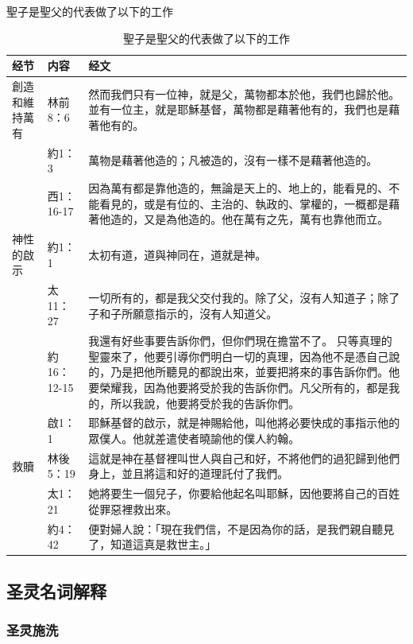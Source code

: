聖子是聖父的代表做了以下的工作
\begin{table}[H]
\centering
\begin{tabular}{p{5.7em}p{6em}p{33em}}  \toprule
经节&内容&经文 \\  \midrule
創造和維持萬有&林前8：6&然而我們只有一位神，就是父，萬物都本於他，我們也歸於他。並有一位主，就是耶穌基督，萬物都是藉著他有的，我們也是藉著他有的。\\  \midrule
&約1：3&萬物是藉著他造的；凡被造的，沒有一樣不是藉著他造的。\\  \midrule
&西1：16-17&因為萬有都是靠他造的，無論是天上的、地上的，能看見的、不能看見的，或是有位的、主治的、執政的、掌權的，一概都是藉著他造的，又是為他造的。他在萬有之先，萬有也靠他而立。\\  \midrule
神性的啟示&約1：1&太初有道，道與神同在，道就是神。\\  \midrule
&太11：27&一切所有的，都是我父交付我的。除了父，沒有人知道子；除了子和子所願意指示的，沒有人知道父。\\  \midrule
&約16：12-15&我還有好些事要告訴你們，但你們現在擔當不了。 只等真理的聖靈來了，他要引導你們明白一切的真理，因為他不是憑自己說的，乃是把他所聽見的都說出來，並要把將來的事告訴你們。他要榮耀我，因為他要將受於我的告訴你們。凡父所有的，都是我的，所以我說，他要將受於我的告訴你們。\\  \midrule
&啟1：1&耶穌基督的啟示，就是神賜給他，叫他將必要快成的事指示他的眾僕人。他就差遣使者曉諭他的僕人約翰。\\  \midrule
救贖&林後5：19&這就是神在基督裡叫世人與自己和好，不將他們的過犯歸到他們身上，並且將這和好的道理託付了我們。\\  \midrule
&太1：21&她將要生一個兒子，你要給他起名叫耶穌，因他要將自己的百姓從罪惡裡救出來。\\  \midrule
&約4：42&便對婦人說：「現在我們信，不是因為你的話，是我們親自聽見了，知道這真是救世主。」\\  \midrule
\bottomrule
\end{tabular}\caption{聖子是聖父的代表做了以下的工作} 
\end{table}










\subsection{圣灵名词解释}


\subsubsection{圣灵施洗}




